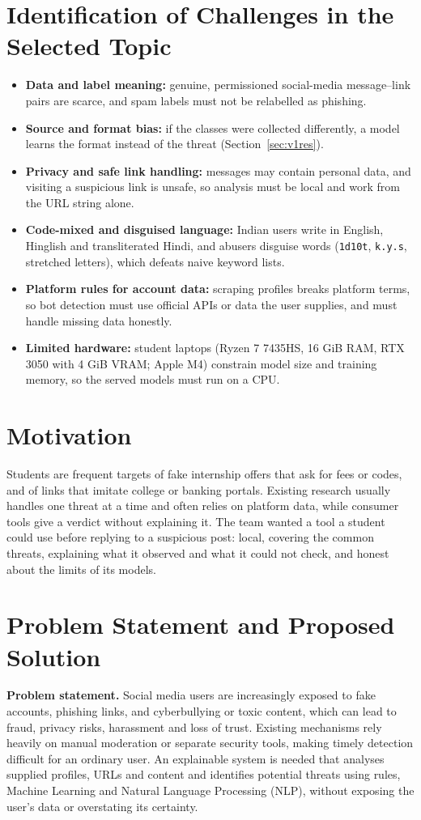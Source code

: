 \section{Identification of Challenges in the Selected Topic}
\begin{itemize}
\item \textbf{Data and label meaning:} genuine, permissioned social-media message--link pairs are scarce, and spam labels must not be relabelled as phishing.
\item \textbf{Source and format bias:} if the classes were collected differently, a model learns the format instead of the threat (Section~\ref{sec:v1res}).
\item \textbf{Privacy and safe link handling:} messages may contain personal data, and visiting a suspicious link is unsafe, so analysis must be local and work from the URL string alone.
\item \textbf{Code-mixed and disguised language:} Indian users write in English, Hinglish and transliterated Hindi, and abusers disguise words (\texttt{1d10t}, \texttt{k.y.s}, stretched letters), which defeats naive keyword lists.
\item \textbf{Platform rules for account data:} scraping profiles breaks platform terms, so bot detection must use official APIs or data the user supplies, and must handle missing data honestly.
\item \textbf{Limited hardware:} student laptops (Ryzen 7 7435HS, 16 GiB RAM, RTX 3050 with 4 GiB VRAM; Apple M4) constrain model size and training memory, so the served models must run on a CPU.
\end{itemize}

\section{Motivation}
\noindent Students are frequent targets of fake internship offers that ask for fees or codes, and of links that imitate college or banking portals. Existing research usually handles one threat at a time and often relies on platform data, while consumer tools give a verdict without explaining it. The team wanted a tool a student could use before replying to a suspicious post: local, covering the common threats, explaining what it observed and what it could not check, and honest about the limits of its models.

\section{Problem Statement and Proposed Solution}
\noindent\textbf{Problem statement.} Social media users are increasingly exposed to fake accounts, phishing links, and cyberbullying or toxic content, which can lead to fraud, privacy risks, harassment and loss of trust. Existing mechanisms rely heavily on manual moderation or separate security tools, making timely detection difficult for an ordinary user. An explainable system is needed that analyses supplied profiles, URLs and content and identifies potential threats using rules, Machine Learning and Natural Language Processing (NLP), without exposing the user's data or overstating its certainty.\\

